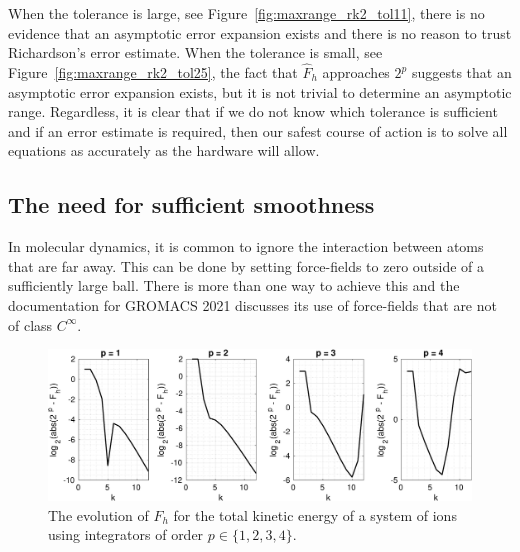 \documentclass[runningheads]{llncs}
\begin{document}
When the tolerance is large, see Figure~\ref{fig:maxrange_rk2_tol11}, there is no evidence that an asymptotic error expansion exists and there is no reason to trust Richardson's error estimate. When the tolerance is small, see Figure~\ref{fig:maxrange_rk2_tol25}, the fact that $\hat{F}_h$ approaches $2^p$ suggests that an asymptotic error expansion exists, but it is not trivial to determine an asymptotic range. Regardless, it is clear that if we do not know which tolerance is sufficient and if an error estimate is required, then our safest course of action is to solve all equations as accurately as the hardware will allow.

\subsection{The need for sufficient smoothness}

In molecular dynamics, it is common to ignore the interaction between atoms that are far away. This can be done by setting force-fields to zero outside of a sufficiently large ball. There is more than one way to achieve this and the documentation for GROMACS 2021 discusses its use of force-fields that are not of class $C^{\infty}$.

\begin{figure}[h!]
  \centering
  \includegraphics[width=\linewidth]{iontrap_mwe1.pdf}
  \caption{The evolution of $F_h$ for the total kinetic energy of a system of ions using integrators of order $p \in \{1,2,3,4\}$.}
  \label{fig:iontrap_mwe1}
\end{figure}
\end{document}
